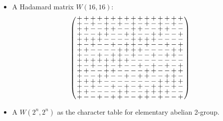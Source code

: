 \documentclass{beamer}
\begin{document}
\begin{frame}

  \begin{itemize}
  \item A Hadamard matrix $W(16,16)$:
    \[
      \arraycolsep=1.0pt\def\arraystretch{0.5}
      \left(
        \begin{array}{cccccccccccccccc}
          +&+&+&+&+&+&+&+&+&+&+&+&+&+&+&+\\
          +&-&+&-&+&-&+&-&+&-&+&-&+&-&+&-\\
          +&+&-&-&+&+&-&-&+&+&-&-&+&+&-&-\\
          +&-&-&+&+&-&-&+&+&-&-&+&+&-&-&+\\
          +&+&+&+&-&-&-&-&+&+&+&+&-&-&-&-\\
          +&-&+&-&-&+&-&+&+&-&+&-&-&+&-&+\\
          +&+&-&-&-&-&+&+&+&+&-&-&-&-&+&+\\
          +&-&-&+&-&+&+&-&+&-&-&+&-&+&+&-\\
          +&+&+&+&+&+&+&+&-&-&-&-&-&-&-&-\\
          +&-&+&-&+&-&+&-&-&+&-&+&-&+&-&+\\
          +&+&-&-&+&+&-&-&-&-&+&+&-&-&+&+\\
          +&-&-&+&+&-&-&+&-&+&+&-&-&+&+&-\\
          +&+&+&+&-&-&-&-&-&-&-&-&+&+&+&+\\
          +&-&+&-&-&+&-&+&-&+&-&+&+&-&+&-\\
          +&+&-&-&-&-&+&+&-&-&+&+&+&+&-&-\\
          +&-&-&+&-&+&+&-&-&+&+&-&+&-&-&+\\
        \end{array}
      \right)     
    \]
    \item A $W(2^n,2^n)$ as the character table for elementary abelian 2-group.
  \end{itemize}

\end{frame}
\end{document}
